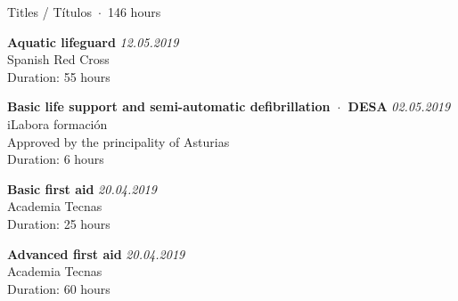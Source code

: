 \documentclass{resume} %
\begin{document}
\begin{rSection}{Titles / Títulos~$\cdot$~146 hours}

{\bf  Aquatic lifeguard} \hfill {\em 12.05.2019} \\ 
Spanish Red Cross \\
Duration: 55 hours

{\bf  Basic life support and semi-automatic defibrillation~$\cdot$~DESA} \hfill {\em 02.05.2019} \\ 
iLabora formación \\
Approved by the principality of Asturias \\
Duration: 6 hours

{\bf  Basic first aid} \hfill {\em 20.04.2019} \\ 
Academia Tecnas \\
Duration: 25 hours

{\bf  Advanced first aid} \hfill {\em 20.04.2019} \\ 
Academia Tecnas \\
Duration: 60 hours

\end{rSection}

\end{document}

